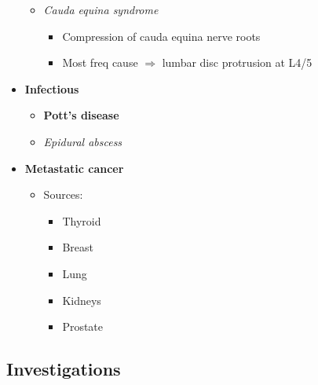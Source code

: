 \documentclass[
  12pt,
]{memoir}
\providecommand{\tightlist}{%
  \setlength{\itemsep}{0pt}\setlength{\parskip}{0pt}}
\begin{document}
\begin{itemize}
  \begin{itemize}
  \tightlist
  \item
    \emph{Cauda equina syndrome}

    \begin{itemize}
    \tightlist
    \item
      Compression of cauda equina nerve roots
    \item
      Most freq cause \(\Rightarrow\) lumbar disc protrusion at L4/5
    \end{itemize}
  \end{itemize}
\item
  \textbf{Infectious}

  \begin{itemize}
  \tightlist
  \item
    \textbf{Pott's disease}
  \item
    \emph{Epidural abscess}
  \end{itemize}
\item
  \textbf{Metastatic cancer}

  \begin{itemize}
  \tightlist
  \item
    Sources:

    \begin{itemize}
    \tightlist
    \item
      Thyroid
    \item
      Breast
    \item
      Lung
    \item
      Kidneys
    \item
      Prostate
    \end{itemize}
  \end{itemize}
\end{itemize}

\hypertarget{investigations-1}{%
\subsection{Investigations}\label{investigations-1}}
\end{document}
